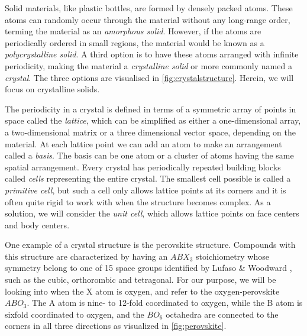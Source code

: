 

Solid materials, like plastic bottles, are formed by densely packed atoms. These atoms can randomly occur through the material without any long-range order, terming the material as an \textit{amorphous solid}. However, if the atoms are periodically ordered in small regions, the material would be known as a \textit{polycrystalline solid}. %
A third option is to have these atoms arranged with infinite periodicity, making the material a \textit{crystalline solid} or more commonly named a \textit{crystal}. The three options are visualised in \autoref{fig:crystalstructure}. Herein, we will focus on crystalline solids.

The periodicity in a crystal is defined in terms of a symmetric array of points in space called the \textit{lattice}, which can be simplified as either a one-dimensional array, a two-dimensional matrix or a three dimensional vector space, depending on the material. At each lattice point we can add an atom to make an arrangement called a \textit{basis}. The basis can be one atom or a cluster of atoms having the same spatial arrangement. Every crystal has periodically repeated building blocks called \textit{cells} representing the entire crystal. The smallest cell possible is called a \textit{primitive cell}, but such a cell only allows lattice points at its corners and it is often quite rigid to work with when the structure becomes complex. As a solution, we will consider the \textit{unit cell}, which allows lattice points on face centers and body centers.

One example of a crystal structure is the perovskite structure. Compounds with this structure are characterized by having an $ABX_3$ stoichiometry whose symmetry belong to one of 15 space groups identified by Lufaso \& Woodward \cite{Lufaso2001}, such as the cubic, orthorombic and tetragonal. For our purpose, we will be looking into when the X atom is oxygen, and refer to the oxygen-perovskite $ABO_3$. The A atom is nine- to 12-fold coordinated to oxygen, while the B atom is sixfold coordinated to oxygen, and the $BO_6$ octahedra are connected to the corners in all three directions as visualized in \autoref{fig:perovskite}.

